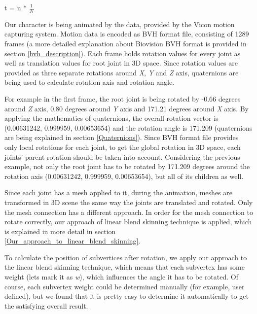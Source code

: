 \documentclass[times, 10pt,twocolumn]{article}
\begin{document}
\begin{center}
t = n $\ast$ $\frac{1}{N}$
\end{center}


\label{animating_our_character}

Our character is being animated by the data, provided by the Vicon motion capturing system. Motion data is encoded as BVH format file, consisting of  1289 frames (a more detailed explanation about Biovision BVH format is provided in section \ref{bvh_description}). Each frame holds rotation values for every joint as well as translation values for root joint in 3D space. Since rotation values are provided as three separate rotations around \emph{X}, \emph{Y} and \emph{Z} axis, quaternions are being used to calculate rotation axis and rotation angle.

For example in the first frame, the root joint is being rotated by -0.66 degrees around \emph{Z} axis, 0.80 degrees around \emph{Y} axis and 171.21 degrees around \emph{X} axis. By applying the mathematics of quaternions, the overall rotation vector is (0.00631242, 0.999959, 0.00653654) and the rotation angle is 171.209 (quaternions are being explained in section \ref{Quaternions}). Since BVH format file provides only local rotations for each joint, to get the global rotation in 3D space, each joints' parent rotation should be taken into account. Considering the previous example, not only the root joint has to be rotated by 171.209 degrees around the rotation axis  (0.00631242, 0.999959, 0.00653654), but all of its children as well.

Since each joint has a mesh applied to it, during the animation, meshes are transformed in 3D scene the same way the joints are translated and rotated. Only the mesh connection has a different approach. In order for the mesh connection to rotate correctly, our approach of linear blend skinning technique is applied, which is explained in more detail in section \ref{Our_approach_to_linear_blend_skinning}.

\label{Our_approach_to_linear_blend_skinning}

To calculate the position of subvertices after rotation, we apply our approach to the linear blend skinning technique, which means that each subvertex has some weight (lets mark it as \emph{w}), which influences the angle it has to be rotated. Of course, each subvertex weight could be determined manually (for example, user defined), but we found that it is pretty easy to determine it automatically to get the satisfying overall result.
\end{document}
